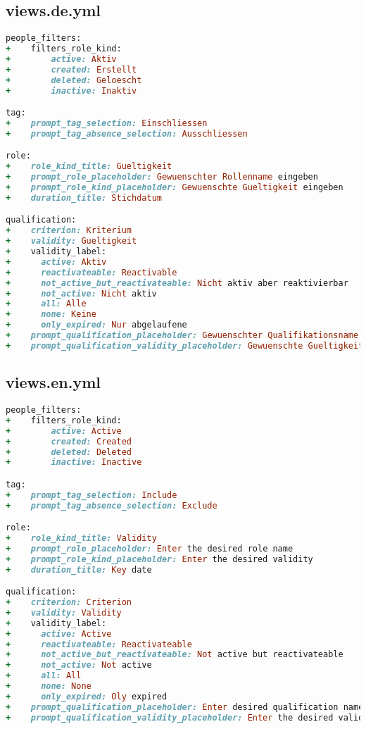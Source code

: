 \newpage

\subsection{views.de.yml}
\begin{lstlisting}[language=Ruby]
people_filters:
+    filters_role_kind:
+        active: Aktiv
+        created: Erstellt
+        deleted: Geloescht
+        inactive: Inaktiv

tag:
+    prompt_tag_selection: Einschliessen
+    prompt_tag_absence_selection: Ausschliessen

role:
+    role_kind_title: Gueltigkeit
+    prompt_role_placeholder: Gewuenschter Rollenname eingeben
+    prompt_role_kind_placeholder: Gewuenschte Gueltigkeit eingeben
+    duration_title: Stichdatum

qualification:
+    criterion: Kriterium
+    validity: Gueltigkeit
+    validity_label:
+      active: Aktiv
+      reactivateable: Reactivable
+      not_active_but_reactivateable: Nicht aktiv aber reaktivierbar
+      not_active: Nicht aktiv
+      all: Alle
+      none: Keine
+      only_expired: Nur abgelaufene
+    prompt_qualification_placeholder: Gewuenschter Qualifikationsname
+    prompt_qualification_validity_placeholder: Gewuenschte Gueltigkeit
\end{lstlisting}

\newpage

\subsection{views.en.yml}
\begin{lstlisting}[language=Ruby]
people_filters:
+    filters_role_kind:
+        active: Active
+        created: Created
+        deleted: Deleted
+        inactive: Inactive

tag:
+    prompt_tag_selection: Include
+    prompt_tag_absence_selection: Exclude

role:
+    role_kind_title: Validity
+    prompt_role_placeholder: Enter the desired role name
+    prompt_role_kind_placeholder: Enter the desired validity
+    duration_title: Key date

qualification:
+    criterion: Criterion
+    validity: Validity
+    validity_label:
+      active: Active
+      reactivateable: Reactivateable
+      not_active_but_reactivateable: Not active but reactivateable
+      not_active: Not active
+      all: All
+      none: None
+      only_expired: Oly expired
+    prompt_qualification_placeholder: Enter desired qualification name
+    prompt_qualification_validity_placeholder: Enter the desired validity
\end{lstlisting}